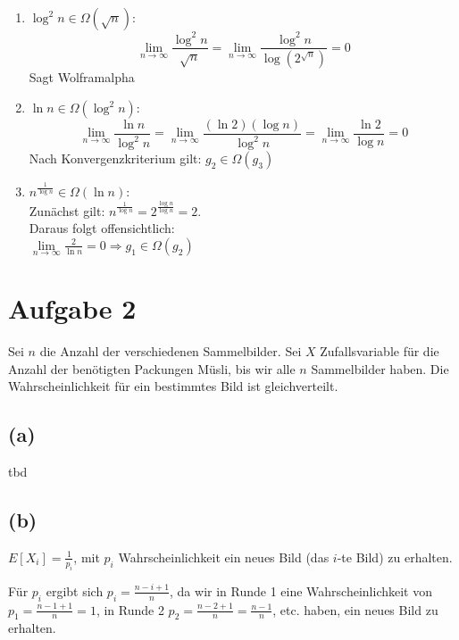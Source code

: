 \documentclass[11pt,a4paper,ngerman]{article}
\begin{document}
\begin{description}
\begin{enumerate}
\item
$\log^2 n \in \Omega (\sqrt{n})$: \\
$$\underset{n\rightarrow\infty}{\lim} \frac{\log^2 n}{\sqrt{n}} = \underset{n\rightarrow\infty}{\lim} \frac{\log^2 n}{\log (2^{\sqrt{n}})} = 0$$
Sagt Wolframalpha

\item
$\ln n \in \Omega (\log^2 n)$: \\
$$\underset{n\rightarrow\infty}{\lim} \frac{\ln n}{\log^2 n} = \underset{n\rightarrow\infty}{\lim} \frac{(\ln 2)(\log n)}{\log^2 n} = \underset{n\rightarrow\infty}{\lim} \frac{\ln 2}{\log n} = 0$$
Nach Konvergenzkriterium gilt: $g_2 \in \Omega(g_3)$
\item
$n^{\frac{1}{\log n}} \in \Omega (\ln n)$: \\
Zunächst gilt: $n^{\frac{1}{\log n}} = 2^{\frac{\log n}{\log n}} = 2$.\\
Daraus folgt offensichtlich:\\
$\underset{n\rightarrow\infty}{\lim} \frac{2}{\ln n} = 0 \Rightarrow g_1 \in \Omega (g_2)$

\end{enumerate}
\end{description}

\section*{Aufgabe 2}

Sei $n$ die Anzahl der verschiedenen Sammelbilder. Sei $X$ Zufallsvariable für die Anzahl der benötigten Packungen Müsli, bis wir alle $n$ Sammelbilder haben. Die Wahrscheinlichkeit für ein bestimmtes Bild ist gleichverteilt.

\subsection*{(a)}

tbd

\subsection*{(b)}
$E[X_{i}]=\frac{1}{p_{i}}$, mit $p_{i}$ Wahrscheinlichkeit ein neues
Bild (das $i$-te Bild) zu erhalten.

Für $p_{i}$ ergibt sich $p_{i}=\frac{n-i+1}{n}$, da wir in Runde
1 eine Wahrscheinlichkeit von $p_{1}=\frac{n-1+1}{n}=1$, in Runde
2 $p_{2}=\frac{n-2+1}{n}=\frac{n-1}{n}$, etc. haben, ein neues Bild
zu erhalten.
\end{document}
